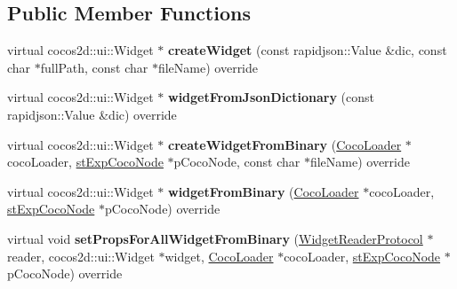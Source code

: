 \subsection*{Public Member Functions}
\begin{DoxyCompactItemize}
\item 
\mbox{\label{classcocostudio_1_1WidgetPropertiesReader0250_a63058618b5ad3bbf05890abe259aa169}} 
virtual cocos2d\+::ui\+::\+Widget $\ast$ {\bfseries create\+Widget} (const rapidjson\+::\+Value \&dic, const char $\ast$full\+Path, const char $\ast$file\+Name) override
\item 
\mbox{\label{classcocostudio_1_1WidgetPropertiesReader0250_a488edb4850a7ca01e9ae7765a5aa4b03}} 
virtual cocos2d\+::ui\+::\+Widget $\ast$ {\bfseries widget\+From\+Json\+Dictionary} (const rapidjson\+::\+Value \&dic) override
\item 
\mbox{\label{classcocostudio_1_1WidgetPropertiesReader0250_a2a160159c0a347d48f571cf5f09a087d}} 
virtual cocos2d\+::ui\+::\+Widget $\ast$ {\bfseries create\+Widget\+From\+Binary} (\hyperlink{classcocostudio_1_1CocoLoader}{Coco\+Loader} $\ast$coco\+Loader, \hyperlink{structcocostudio_1_1stExpCocoNode}{st\+Exp\+Coco\+Node} $\ast$p\+Coco\+Node, const char $\ast$file\+Name) override
\item 
\mbox{\label{classcocostudio_1_1WidgetPropertiesReader0250_ae2180083b619a05252f3d59b307bdfba}} 
virtual cocos2d\+::ui\+::\+Widget $\ast$ {\bfseries widget\+From\+Binary} (\hyperlink{classcocostudio_1_1CocoLoader}{Coco\+Loader} $\ast$coco\+Loader, \hyperlink{structcocostudio_1_1stExpCocoNode}{st\+Exp\+Coco\+Node} $\ast$p\+Coco\+Node) override
\item 
\mbox{\label{classcocostudio_1_1WidgetPropertiesReader0250_a2e0467d8392208fe68443e1e3fcbfb55}} 
virtual void {\bfseries set\+Props\+For\+All\+Widget\+From\+Binary} (\hyperlink{classcocostudio_1_1WidgetReaderProtocol}{Widget\+Reader\+Protocol} $\ast$reader, cocos2d\+::ui\+::\+Widget $\ast$widget, \hyperlink{classcocostudio_1_1CocoLoader}{Coco\+Loader} $\ast$coco\+Loader, \hyperlink{structcocostudio_1_1stExpCocoNode}{st\+Exp\+Coco\+Node} $\ast$p\+Coco\+Node) override

\end{DoxyCompactItemize}
